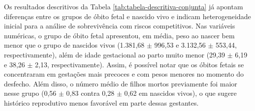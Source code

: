 Os resultados descritivos da Tabela \ref{tab:tabela-descritiva-conjunta} já apontam
diferenças entre os grupos de óbito fetal e nascido vivo e indicam heterogeneidade
inicial para a análise de sobrevivência com riscos competitivos. Nas variáveis 
numéricas, o grupo de óbito fetal apresentou, em média, peso ao nascer bem menor 
que o grupo de nascidos vivos (1.381,68 $\pm$ 996,53 e 3.132,56 $\pm$ 553,44, 
respectivamente), além de idade gestacional ao parto muito menor (29,39 $\pm$ 6,19 
e 38,26 $\pm$ 2,13, respectivamente). Assim, é possível notar que os óbitos fetais 
se concentraram em gestações mais precoces e com pesos menores no momento do 
desfecho. Além disso, o número médio de filhos mortos previamente foi maior 
nesse grupo (0,56 $\pm$ 0,83 contra 0,28 $\pm$ 0,62 em nascidos vivos), o que 
sugere histórico reprodutivo menos favorável em parte dessas gestantes.

